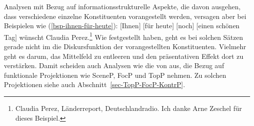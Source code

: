 \begin{exe}
\begin{xlist}
%
%
Analysen mit Bezug auf informationsstrukturelle Aspekte, die davon ausgehen, dass verschiedene
einzelne Konstituenten vorangestellt werden, versagen aber bei Beispielen wie
(\ref{bsp-ihnen-für-heute}):
\ea\label{bsp-ihnen-für-heute}
{}[Ihnen] [für heute] [noch] [einen schönen Tag] wünscht Claudia Perez.\footnote{
  Claudia Perez, Länderreport, Deutschlandradio. Ich danke Arne Zeschel für dieses Beispiel.
}%
\z
Wie \citet*[117]{MBC2012a} festgestellt haben, geht es bei solchen Sätzen gerade nicht im die
Diskursfunktion der vorangestellten Konstituenten. Vielmehr geht es darum, das Mittelfeld zu
entleeren und den präsentativen Effekt dort zu verstärken. Damit scheiden auch Analysen wie die von
\citet[]{Speyer2008a} aus, die Bezug auf funktionale Projektionen wie
SceneP, FocP und
TopP \parencites{Rizzi97a-u}{Grewendorf2002a} nehmen. Zu solchen
Projektionen siehe auch Abschnitt~\ref{sec-TopP-FocP-KontrP}. 


\end{xlist}
\end{exe}

